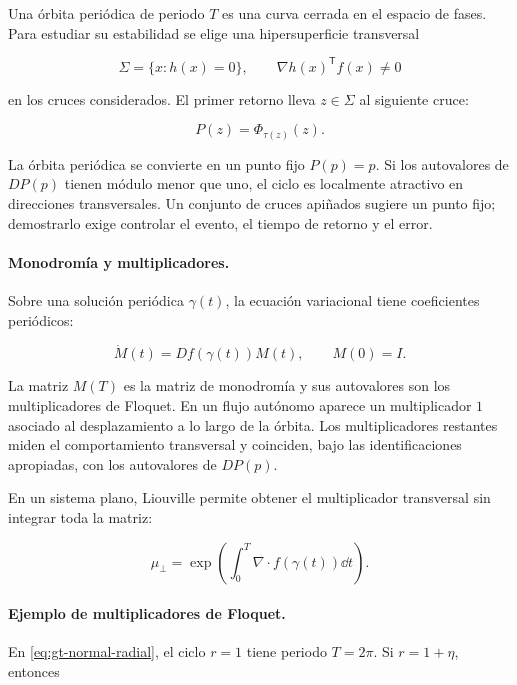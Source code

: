 Una órbita periódica de periodo $T$ es una curva cerrada en el espacio de fases. Para
estudiar su estabilidad se elige una hipersuperficie transversal

\begin{equation}
 \Sigma=\{x:h(x)=0\},\qquad
 \nabla h(x)^{\mathsf T}f(x)\neq0
 \label{eq:gt-seccion}
\end{equation}

en los cruces considerados. El primer retorno lleva $z\in\Sigma$ al siguiente cruce:

\begin{equation}
 P(z)=\Phi_{\tau(z)}(z).
 \label{eq:gt-retorno}
\end{equation}

La órbita periódica se convierte en un punto fijo $P(p)=p$. Si los autovalores de
$DP(p)$ tienen módulo menor que uno, el ciclo es localmente atractivo en direcciones
transversales. Un conjunto de cruces apiñados sugiere un punto fijo; demostrarlo exige
controlar el evento, el tiempo de retorno y el error.

\paragraph{Monodromía y multiplicadores.}
Sobre una solución periódica $\gamma(t)$, la ecuación variacional tiene coeficientes
periódicos:

\begin{equation}
 \dot M(t)=Df(\gamma(t))M(t),\qquad M(0)=I.
 \label{eq:gt-variacional-periodica}
\end{equation}

La matriz $M(T)$ es la matriz de monodromía y sus autovalores son los multiplicadores
de Floquet. En un flujo autónomo aparece un multiplicador $1$ asociado al
desplazamiento a lo largo de la órbita. Los multiplicadores restantes miden el
comportamiento transversal y coinciden, bajo las identificaciones apropiadas, con los
autovalores de $DP(p)$.

En un sistema plano, Liouville permite obtener el multiplicador transversal sin
integrar toda la matriz:

\begin{equation}
 \mu_\perp=
 \exp\left(\int_0^T\nabla\cdot f(\gamma(t))\dd t\right).
 \label{eq:gt-multiplicador-planar}
\end{equation}

\paragraph{Ejemplo de multiplicadores de Floquet.}
En \eqref{eq:gt-normal-radial}, el ciclo $r=1$ tiene periodo $T=2\pi$. Si
$r=1+\eta$, entonces


